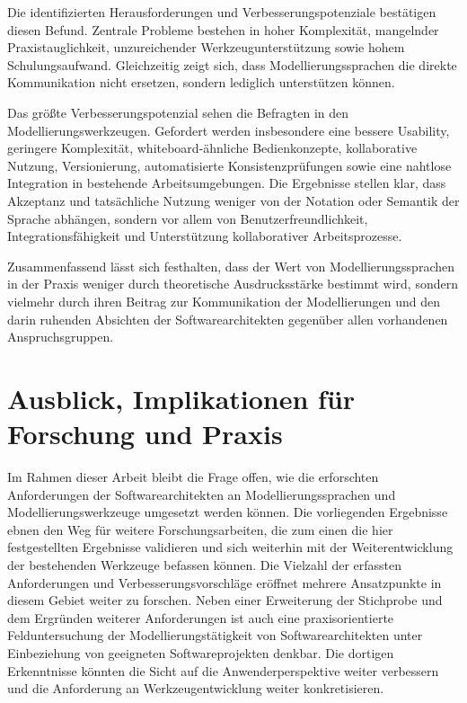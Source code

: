 Die identifizierten Herausforderungen und Verbesserungspotenziale bestätigen diesen Befund. Zentrale Probleme bestehen in hoher Komplexität, mangelnder Praxistauglichkeit, unzureichender Werkzeugunterstützung sowie hohem Schulungsaufwand. Gleichzeitig zeigt sich, dass Modellierungssprachen die direkte Kommunikation nicht ersetzen, sondern lediglich unterstützen können.

Das größte Verbesserungspotenzial sehen die Befragten in den Modellierungswerkzeugen. Gefordert werden insbesondere eine bessere Usability, geringere Komplexität, whiteboard-ähnliche Bedienkonzepte, kollaborative Nutzung, Versionierung, automatisierte Konsistenzprüfungen sowie eine nahtlose Integration in bestehende Arbeitsumgebungen. Die Ergebnisse stellen klar, dass Akzeptanz und tatsächliche Nutzung weniger von der Notation oder Semantik der Sprache abhängen, sondern vor allem von Benutzerfreundlichkeit, Integrationsfähigkeit und Unterstützung kollaborativer Arbeitsprozesse.

Zusammenfassend lässt sich festhalten, dass der Wert von Modellierungssprachen in der Praxis weniger durch theoretische Ausdrucksstärke bestimmt wird, sondern vielmehr durch ihren Beitrag zur Kommunikation der Modellierungen und den darin ruhenden Absichten der Softwarearchitekten gegenüber allen vorhandenen Anspruchsgruppen.


\section{Ausblick, Implikationen für Forschung und Praxis}

Im Rahmen dieser Arbeit bleibt die Frage offen, wie die erforschten Anforderungen der Softwarearchitekten an Modellierungssprachen und Modellierungswerkzeuge umgesetzt werden können. Die vorliegenden Ergebnisse ebnen den Weg für weitere Forschungsarbeiten, die zum einen die hier festgestellten Ergebnisse validieren und sich weiterhin mit der Weiterentwicklung der bestehenden Werkzeuge befassen können. Die Vielzahl der erfassten Anforderungen und Verbesserungsvorschläge eröffnet mehrere Ansatzpunkte in diesem Gebiet weiter zu forschen. Neben einer Erweiterung der Stichprobe und dem Ergründen weiterer Anforderungen ist auch eine praxisorientierte Felduntersuchung der Modellierungstätigkeit von Softwarearchitekten unter Einbeziehung von geeigneten Softwareprojekten denkbar. Die dortigen Erkenntnisse könnten die Sicht auf die Anwenderperspektive weiter verbessern und die Anforderung an Werkzeugentwicklung weiter konkretisieren.